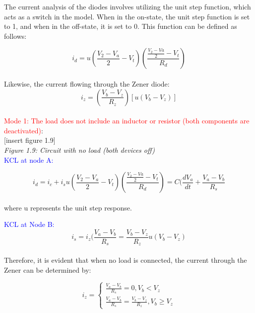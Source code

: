 
The current analysis of the diodes involves utilizing the unit step function, which acts as a switch in the model. When in the on-state, the unit step function is set to 1, and when in the off-state, it is set to 0. This function can be defined as follows:

\begin{equation}
    i_d=u(\frac{V_2-V_a}{2}-V_t)(\frac{\frac{V_2-Va}{2}-V_t}{R_d})
\end{equation}\\

Likewise, the current flowing through the Zener diode:\\

\begin{equation}
    i_z=(\frac{V_b-V_z}{R_z})[u(V_b-V_z)]
\end{equation}\\

\large\textcolor{red}{Mode 1: The load does not include an inductor or resistor (both components are deactivated)}:\\

[insert figure 1.9]\\

\emph{Figure 1.9: Circuit with no load (both devices off)}\\

\textcolor{blue}{KCL at node A:}

\begin{equation}
    i_d=i_c+i_s
    u(\frac{V_2-V_a}{2}-V_t)(\frac{\frac{V_2-Va}{2}-V_t}{R_d})=C(\frac{dV_a}{dt}+\frac{V_a-V_b}{R_s}
\end{equation}\\

where u represents the unit step response.

\textcolor{blue}{KCL at Node B:}
\begin{equation}
    i_s=i_z
    (\frac{V_a-V_b}{R_s}=\frac{V_b-V_z}{R_z}u(V_b-V_z)
\end{equation}\\

Therefore, it is evident that when no load is connected, the current through the Zener can be determined by:

\begin{equation}
    i_z= \begin{cases}
    \frac{V_a-V_b}{R_s}=0,  V_b<V_z\\
    \frac{V_a-V_b}{R_s}=\frac{V_b-V_z}{R_z},  V_b\geq V_z
    \end{cases}
\end{equation}\\


